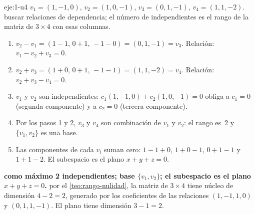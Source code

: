 \begin{solucion}{eje:1-u4}
\datos $v_1=(1,-1,0)$, $v_2=(1,0,-1)$, $v_3=(0,1,-1)$, $v_4=(1,1,-2)$.
\planteamiento buscar relaciones de dependencia; el número de independientes es el rango de la matriz de $3\times 4$ con esas columnas.
\pasos
\begin{enumerate}[label=\arabic*.]
  \item $v_2-v_1=(1-1,\,0+1,\,-1-0)=(0,1,-1)=v_3$. Relación: $v_1-v_2+v_3=0$.
  \item $v_2+v_3=(1+0,\,0+1,\,-1-1)=(1,1,-2)=v_4$. Relación: $v_2+v_3-v_4=0$.
  \item $v_1$ y $v_2$ son independientes: $c_1(1,-1,0)+c_2(1,0,-1)=0$ obliga a $c_1=0$ (segunda componente) y a $c_2=0$ (tercera componente).
  \item Por los pasos 1 y 2, $v_3$ y $v_4$ son combinación de $v_1$ y $v_2$: el rango es~2 y $\{v_1,v_2\}$ es una base.
  \item Las componentes de cada $v_i$ suman cero: $1-1+0$, $1+0-1$, $0+1-1$ y $1+1-2$. El subespacio es el plano $x+y+z=0$.
\end{enumerate}
\resultado \textbf{como máximo 2 independientes; base $\{v_1,v_2\}$; el subespacio es el plano $x+y+z=0$.}
\comprobacion por el \cref{teo:rango-nulidad}, la matriz de $3\times 4$ tiene núcleo de dimensión $4-2=2$, generado por los coeficientes de las relaciones $(1,-1,1,0)$ y $(0,1,1,-1)$. El plano tiene dimensión $3-1=2$.
\end{solucion}


